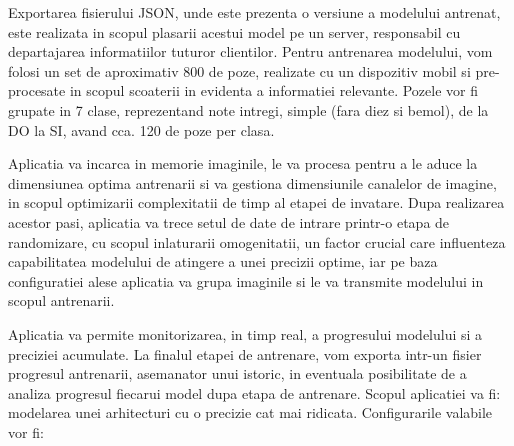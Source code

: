 	Exportarea fisierului JSON, unde este prezenta o versiune a modelului antrenat, este realizata in scopul plasarii acestui model pe un server, responsabil cu departajarea informatiilor tuturor clientilor. 
	Pentru antrenarea modelului, vom folosi un set de aproximativ 800 de poze, realizate cu un dispozitiv mobil si pre-procesate in scopul scoaterii in evidenta a informatiei relevante. Pozele vor fi grupate in  7 clase, reprezentand note intregi, simple (fara diez si bemol), de la DO la SI, avand cca. 120 de poze per clasa. 
	
	Aplicatia va incarca in memorie imaginile, le va procesa pentru a le aduce la dimensiunea optima antrenarii si va gestiona dimensiunile canalelor de imagine, in scopul optimizarii complexitatii de timp al etapei de invatare. Dupa realizarea acestor pasi, aplicatia va trece setul de date de intrare printr-o etapa de randomizare, cu scopul inlaturarii omogenitatii, un factor crucial care influenteza capabilitatea modelului de atingere a unei precizii optime, iar pe baza configuratiei alese aplicatia va grupa imaginile si le va transmite modelului in scopul antrenarii.
	
	Aplicatia va permite monitorizarea, in timp real, a progresului modelului si a preciziei acumulate. La finalul etapei de antrenare, vom exporta intr-un fisier progresul antrenarii, asemanator unui istoric, in eventuala posibilitate de a analiza progresul fiecarui model dupa etapa de antrenare.
	Scopul aplicatiei va fi: modelarea unei arhitecturi cu o precizie cat mai ridicata.
	Configurarile valabile vor fi:
	
